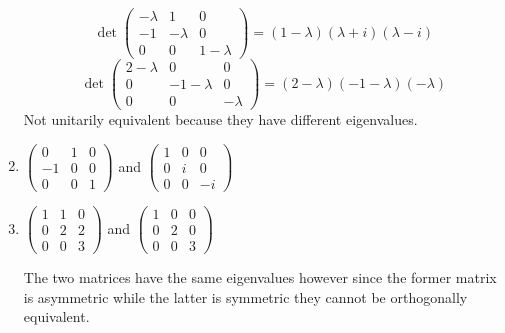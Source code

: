 \begin{enumerate}
\begin{equation}
\det{
\begin{pmatrix}
-\lambda & 1 & 0\\
-1 & -\lambda & 0\\
0 & 0 & 1-\lambda
\end{pmatrix}
} = (1-\lambda)(\lambda+i)(\lambda-i)
\end{equation}
\begin{equation}
\det{
\begin{pmatrix}
2-\lambda & 0 & 0\\
0 & -1 -\lambda & 0\\
0 & 0 & -\lambda 
\end{pmatrix}
} = (2-\lambda)(-1-\lambda)(-\lambda)
\end{equation}
Not unitarily equivalent  because they have different eigenvalues.
\item $\begin{pmatrix}
0 & 1 & 0\\
-1 & 0 & 0\\
0 & 0 & 1
\end{pmatrix}$ and
$\begin{pmatrix}
1 & 0 & 0\\
0 & i & 0\\
0 & 0 & -i
\end{pmatrix}$
\item $\begin{pmatrix}
1 & 1 & 0\\
0 & 2 & 2\\
0 & 0 & 3
  \end{pmatrix}$
and 
$
\begin{pmatrix}
1 & 0 & 0\\
0 & 2 & 0\\
0 & 0 & 3
\end{pmatrix}$

The two matrices have the same eigenvalues however since the former
matrix is asymmetric while the latter is symmetric they cannot be
orthogonally equivalent.
\end{enumerate}
